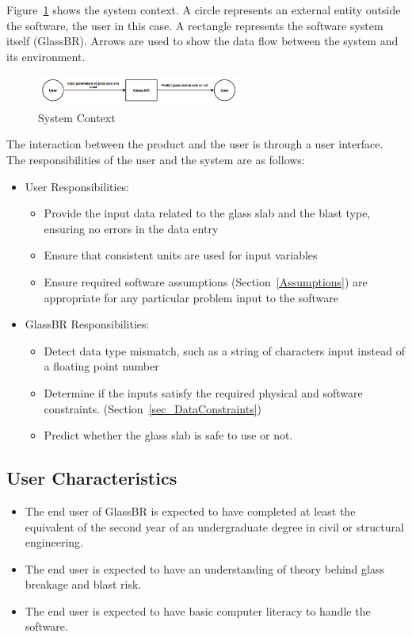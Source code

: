 \documentclass[12pt]{article}
\newcommand{\progname}{GlassBR}
\begin{document}
Figure~\ref{Fig_SystemContext} shows the system context.  A circle represents an
external entity outside the software, the user in this case.  A rectangle
represents the software system itself (\progname{}).  Arrows are used to show the data
flow between the system and its environment.

\begin{figure}[h!]
	\begin{center}
		\includegraphics[width=0.6\textwidth]{SystemContextFigure.PNG}
		\caption{System Context}
		\label{Fig_SystemContext} 
	\end{center}
\end{figure}

The interaction between the product and the user is through a user
interface.  The responsibilities of the user and the system are as follows:

\begin{itemize}
\item User Responsibilities:
  \begin{itemize}
  \item Provide the input data related to the glass slab and the blast type,
    ensuring no errors in the data entry
  \item Ensure that consistent units are used for input variables
  \item Ensure required software assumptions (Section~\ref{Assumptions}) are
    appropriate for any particular problem input to the software
  \end{itemize}
\item \progname{} Responsibilities:
  \begin{itemize}
  \item Detect data type mismatch, such as a string of characters input instead
    of a floating point number
  \item  Determine if the inputs satisfy the required physical and software
  constraints. (Section~\ref{sec_DataConstraints})
  \item Predict whether the glass slab is safe to use or not.
  \end{itemize}
\end{itemize}

\subsection{User Characteristics} 
\label{sec_userchar}
\begin{itemize}
	\item The end user of \progname{} is expected to have completed at least the
	equivalent of the second year of an undergraduate degree in civil or
	structural engineering.
	\item The end user is expected to have an understanding of theory behind glass
	breakage and blast risk.
	\item The end user is expected to have basic computer literacy to handle the
	software.
\end{itemize}
\end{document}
